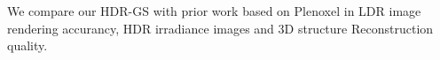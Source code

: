 We compare our HDR-GS with prior work based on Plenoxel
in LDR image rendering accurancy, HDR irradiance images
and 3D structure Reconstruction quality.

